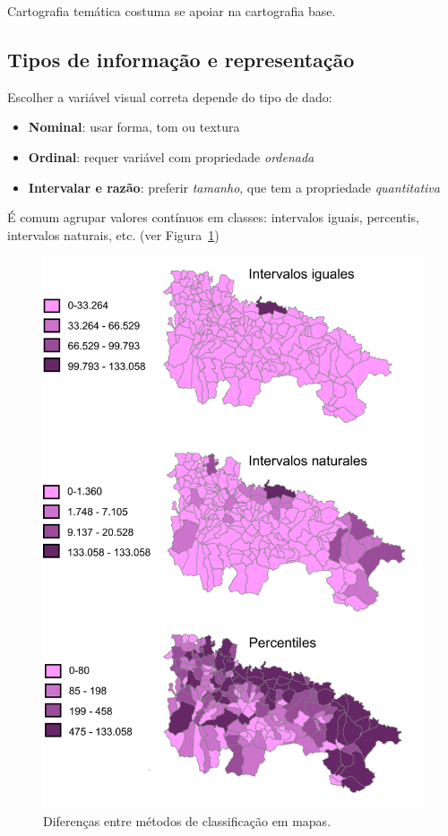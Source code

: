 Cartografia temática costuma se apoiar na cartografia base.

\subsection{Tipos de informação e representação}

Escolher a variável visual correta depende do tipo de dado:

\begin{itemize}
 \item \textbf{Nominal}: usar forma, tom ou textura
 \item \textbf{Ordinal}: requer variável com propriedade \emph{ordenada}
 \item \textbf{Intervalar e razão}: preferir \emph{tamanho}, que tem a propriedade \emph{quantitativa}
\end{itemize}

É comum agrupar valores contínuos em classes: intervalos iguais, percentis, intervalos naturais, etc. (ver Figura~\ref{Fig:TiposIntervalosClases})

\begin{figure}[!hbt]
\centering
\includegraphics[width=.7\columnwidth]{Visualizacao/TiposIntervalosClases.pdf}
\caption{\small Diferenças entre métodos de classificação em mapas.}
\label{Fig:TiposIntervalosClases} 
\end{figure}

